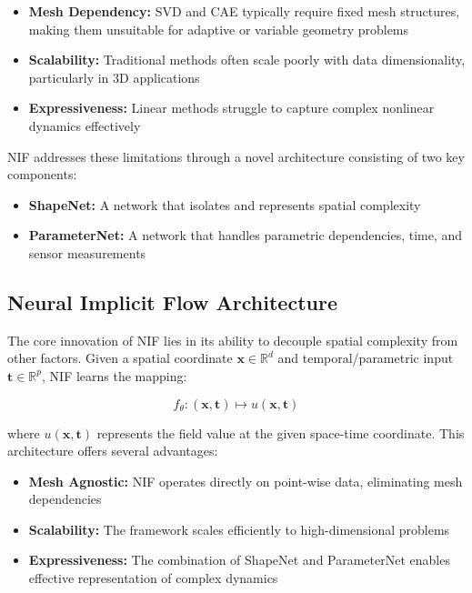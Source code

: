 \documentclass[10pt,journal,compsoc]{IEEEtran}
\begin{document}
\begin{itemize}
    \item \textbf{Mesh Dependency:} SVD and CAE typically require fixed mesh structures, making them unsuitable for adaptive or variable geometry problems
    \item \textbf{Scalability:} Traditional methods often scale poorly with data dimensionality, particularly in 3D applications
    \item \textbf{Expressiveness:} Linear methods struggle to capture complex nonlinear dynamics effectively
\end{itemize}

NIF addresses these limitations through a novel architecture consisting of two key components:

\begin{itemize}
    \item \textbf{ShapeNet:} A network that isolates and represents spatial complexity
    \item \textbf{ParameterNet:} A network that handles parametric dependencies, time, and sensor measurements
\end{itemize}

\subsection{Neural Implicit Flow Architecture}
The core innovation of NIF lies in its ability to decouple spatial complexity from other factors. Given a spatial coordinate $\mathbf{x} \in \mathbb{R}^d$ and temporal/parametric input $\mathbf{t} \in \mathbb{R}^p$, NIF learns the mapping:

\begin{equation}
    f_\theta: (\mathbf{x}, \mathbf{t}) \mapsto u(\mathbf{x}, \mathbf{t})
\end{equation}

where $u(\mathbf{x}, \mathbf{t})$ represents the field value at the given space-time coordinate. This architecture offers several advantages:

\begin{itemize}
    \item \textbf{Mesh Agnostic:} NIF operates directly on point-wise data, eliminating mesh dependencies
    \item \textbf{Scalability:} The framework scales efficiently to high-dimensional problems
    \item \textbf{Expressiveness:} The combination of ShapeNet and ParameterNet enables effective representation of complex dynamics
\end{itemize}
\end{document}
